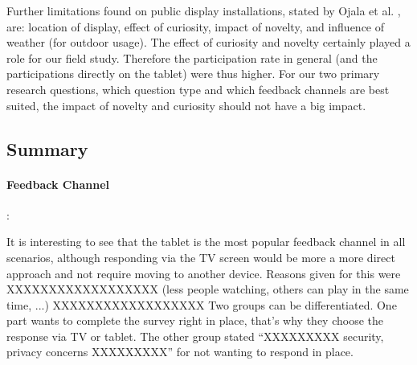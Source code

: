 	Further limitations found on public display installations, stated by Ojala et al. \cite{Ojala2011}, are: location of display, effect of curiosity, impact of novelty, and influence of weather (for outdoor usage). The effect of curiosity and novelty certainly played a role for our field study. Therefore the participation rate in general (and the participations directly on the tablet) were thus higher. For our two primary research questions, which question type and which feedback channels are best suited, the impact of novelty and curiosity should not have a big impact.



\subsection{Summary}

	\paragraph{Feedback Channel}:

	It is interesting to see that the tablet is the most popular feedback channel in all scenarios, although responding via the TV screen would be more a more direct approach and not require moving to another device. Reasons given for this were XXXXXXXXXXXXXXXXXX (less people watching, others can play in the same time, ...) XXXXXXXXXXXXXXXXXX
	Two groups can be differentiated. One part wants to complete the survey right in place, that's why they choose the response via TV or tablet. The other group stated ``XXXXXXXXX security, privacy concerns XXXXXXXXX'' for not wanting to respond in place. 




